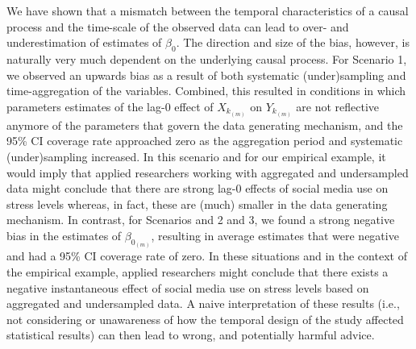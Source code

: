 \documentclass[man]{apa7} %
\begin{document}
We have shown that a mismatch between the temporal characteristics of a causal process and the time-scale of the observed data can lead to over- and underestimation of estimates of $\beta_{0}$. The direction and size of the bias, however, is naturally very much dependent on the underlying causal process. For Scenario 1, we observed an upwards bias as a result of both systematic (under)sampling and time-aggregation of the variables. Combined, this resulted in conditions in which parameters estimates of the lag-0 effect of $X_{k_{(m)}}$ on $Y_{k_{(m)}}$ are not reflective anymore of the parameters that govern the data generating mechanism, and the 95\% CI coverage rate approached zero as the aggregation period and systematic (under)sampling increased. In this scenario and for our empirical example, it would imply that applied researchers working with aggregated and undersampled data might conclude that there are strong lag-0 effects of social media use on stress levels whereas, in fact, these are (much) smaller in the data generating mechanism. In contrast, for Scenarios and 2 and 3, we found a strong negative bias in the estimates of $\beta_{0_{(m)}}$, resulting in average estimates that were negative and had a 95\% CI coverage rate of zero. In these situations and in the context of the empirical example, applied researchers might conclude that there exists a negative instantaneous effect of social media use on stress levels based on aggregated and undersampled data. A naive interpretation of these results (i.e., not considering or unawareness of how the temporal design of the study affected statistical results) can then lead to wrong, and potentially harmful advice.  
\end{document}
